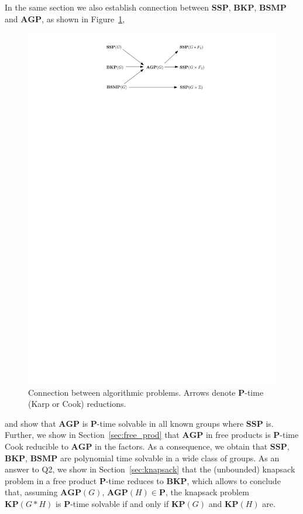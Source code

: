 \documentclass[10pt]{amsart}
\theoremstyle{definition}
\def\P{{\mathbf{P}}}
\def\SSP{{\mathbf{SSP}}}
\def\BSMP{{\mathbf{BSMP}}}
\def\BKP{{\mathbf{BKP}}}
\def\KP{{\mathbf{KP}}}
\def\AGP{{\mathbf{AGP}}}
\begin{document}
In the same section we also establish connection between $\SSP$, $\BKP$, $\BSMP$ and $\AGP$, as shown in Figure~\ref{fi:reductions},
\begin{figure}[h]
 \centering
 \includegraphics{reductions}
 \caption{Connection between algorithmic problems. Arrows denote $\P$-time (Karp or Cook) reductions.}\label{fi:reductions}
\end{figure}
and show that $\AGP$ is $\P$-time solvable in all known groups where $\SSP$ is. Further, we show in %
Section~\ref{sec:free_prod} that $\AGP$ in free products is $\P$-time Cook reducible to $\AGP$ in the factors. %
As a consequence, we obtain that $\SSP$, $\BKP$, $\BSMP$ are polynomial time solvable in a wide class of groups. As an answer to Q2, we show in Section~\ref{sec:knapsack} that the (unbounded) knapsack problem in a free product $\P$-time reduces to $\BKP$, which allows to conclude that, assuming $\AGP(G)$, $\AGP(H)\in\P$, the knapsack problem $\KP(G*H)$ is $\P$-time solvable if and only if $\KP(G)$ and $\KP(H)$ are. %
\end{document}
